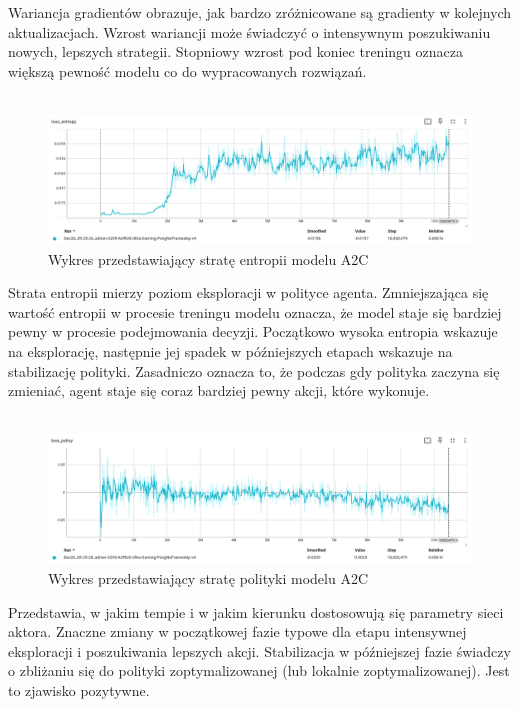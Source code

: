 \documentclass[a4paper, 12pt]{article}
\numberwithin{equation}{section}
\begin{document}
    Wariancja gradientów obrazuje, jak bardzo zróżnicowane są gradienty w kolejnych aktualizacjach. Wzrost wariancji może świadczyć o intensywnym poszukiwaniu nowych, lepszych strategii. Stopniowy wzrost pod koniec treningu oznacza większą pewność modelu co do wypracowanych rozwiązań.
    \\ \\ 
    \begin{figure}[H]
        \centering
        \includegraphics[width=\textwidth]{pictures/A2C_loss_entropy.png}
        \caption{Wykres przedstawiający stratę entropii modelu A2C}
    \end{figure}
    Strata entropii mierzy poziom eksploracji w polityce agenta.
    Zmniejszająca się wartość entropii w procesie treningu modelu
    oznacza, że model staje się bardziej pewny w procesie podejmowania decyzji. Początkowo wysoka entropia wskazuje na eksplorację,
    następnie jej spadek w późniejszych etapach wskazuje na stabilizację polityki.
    Zasadniczo oznacza to, że podczas gdy polityka zaczyna się zmieniać, agent staje się coraz bardziej pewny akcji, które wykonuje.
    \\ \\ 
    \begin{figure}[H]
        \centering
        \includegraphics[width=\textwidth]{pictures/A2C_loss_policy.png}
        \caption{Wykres przedstawiający stratę polityki modelu A2C}
    \end{figure}
    Przedstawia, w jakim tempie i w jakim kierunku dostosowują się parametry sieci aktora. 
    Znaczne zmiany w początkowej fazie typowe dla etapu intensywnej eksploracji i poszukiwania lepszych akcji.
    Stabilizacja w późniejszej fazie świadczy o zbliżaniu się do polityki zoptymalizowanej (lub lokalnie zoptymalizowanej). Jest to zjawisko pozytywne.
\end{document}
